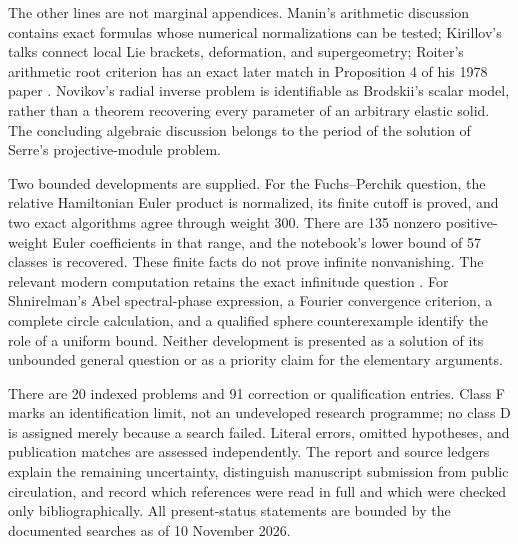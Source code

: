 The other lines are not marginal appendices. Manin's arithmetic discussion
contains exact formulas whose numerical normalizations can be tested;
Kirillov's talks connect local Lie brackets, deformation, and
supergeometry; Roiter's arithmetic root criterion has an exact later
match in Proposition 4 of his 1978 paper \citep{roiter1978roots}.
Novikov's radial inverse problem is identifiable as Brodskii's scalar
model, rather than a theorem recovering every parameter of an arbitrary
elastic solid. The concluding algebraic discussion belongs to the
period of the solution of Serre's projective-module problem.

Two bounded developments are supplied. For the Fuchs--Perchik question,
the relative Hamiltonian Euler product is normalized, its finite cutoff
is proved, and two exact algorithms agree through weight 300. There are
135 nonzero positive-weight Euler coefficients in that range, and the
notebook's lower bound of 57 classes is recovered. These finite facts do
not prove infinite nonvanishing. The relevant modern computation retains
the exact infinitude question \citep[\S2]{mohammadzadehfuchs2014cohomology}.
For Shnirelman's Abel spectral-phase expression, a Fourier convergence
criterion, a complete circle calculation, and a qualified sphere
counterexample identify the role of a uniform bound. Neither development
is presented as a solution of its unbounded general question or as a
priority claim for the elementary arguments.

There are 20 indexed problems and 91 correction or
qualification entries. Class F marks an identification limit, not an
undeveloped research programme; no class D is assigned merely because a
search failed. Literal errors, omitted hypotheses, and publication matches
are assessed independently. The report and source ledgers explain the
remaining uncertainty, distinguish manuscript submission from public
circulation, and record which references were read in full and which
were checked only bibliographically. All present-status statements are
bounded by the documented searches as of 10 November 2026.
